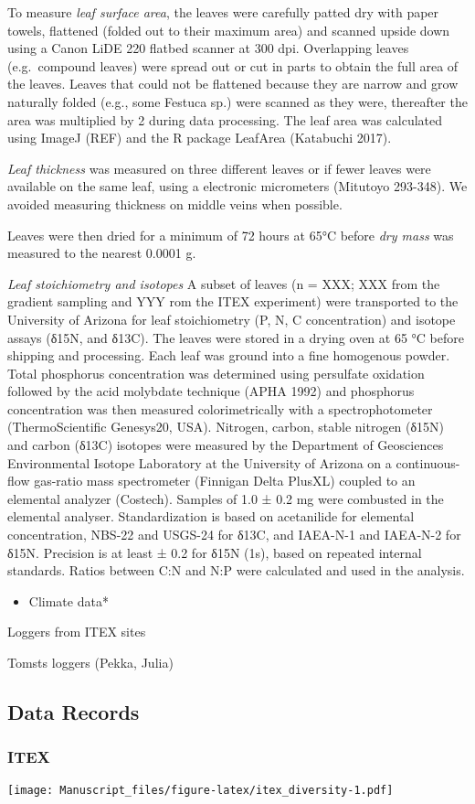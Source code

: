 \documentclass[a4paper]{article}
\providecommand{\tightlist}{%
  \setlength{\itemsep}{0pt}\setlength{\parskip}{0pt}}
\begin{document}
To measure \emph{leaf surface area}, the leaves were carefully patted dry with paper towels, flattened (folded out to their maximum area) and scanned upside down using a Canon LiDE 220 flatbed scanner at 300 dpi.
Overlapping leaves (e.g.~compound leaves) were spread out or cut in parts to obtain the full area of the leaves.
Leaves that could not be flattened because they are narrow and grow naturally folded (e.g., some Festuca sp.) were scanned as they were, thereafter the area was multiplied by 2 during data processing.
The leaf area was calculated using ImageJ (REF) and the R package LeafArea (Katabuchi 2017).

\emph{Leaf thickness} was measured on three different leaves or if fewer leaves were available on the same leaf, using a electronic micrometers (Mitutoyo 293-348).
We avoided measuring thickness on middle veins when possible.

Leaves were then dried for a minimum of 72 hours at 65°C before \emph{dry mass} was measured to the nearest 0.0001 g.

\emph{Leaf stoichiometry and isotopes} A subset of leaves (n = XXX; XXX from the gradient sampling and YYY rom the ITEX experiment) were transported to the University of Arizona for leaf stoichiometry (P, N, C concentration) and isotope assays (δ15N, and δ13C). The leaves were stored in a drying oven at 65 °C before shipping and processing. Each leaf was ground into a fine homogenous powder. Total phosphorus concentration was determined using persulfate oxidation followed by the acid molybdate technique (APHA 1992) and phosphorus concentration was then measured colorimetrically with a spectrophotometer (ThermoScientific Genesys20, USA). Nitrogen, carbon, stable nitrogen (δ15N) and carbon (δ13C) isotopes were measured by the Department of Geosciences Environmental Isotope Laboratory at the University of Arizona on a continuous-flow gas-ratio mass spectrometer (Finnigan Delta PlusXL) coupled to an elemental analyzer (Costech). Samples of 1.0 ± 0.2 mg were combusted in the elemental analyser. Standardization is based on acetanilide for elemental concentration, NBS-22 and USGS-24 for δ13C, and IAEA-N-1 and IAEA-N-2 for δ15N. Precision is at least ± 0.2 for δ15N (1s), based on repeated internal standards. Ratios between C:N and N:P were calculated and used in the analysis.

\begin{itemize}
\tightlist
\item
  Climate data*
\end{itemize}

Loggers from ITEX sites

Tomsts loggers (Pekka, Julia)

\hypertarget{data-records}{%
\subsection{Data Records}\label{data-records}}

\hypertarget{itex}{%
\subsubsection{ITEX}\label{itex}}

\texttt{[image: Manuscript\_files/figure-latex/itex\_diversity-1.pdf]}
\end{document}
